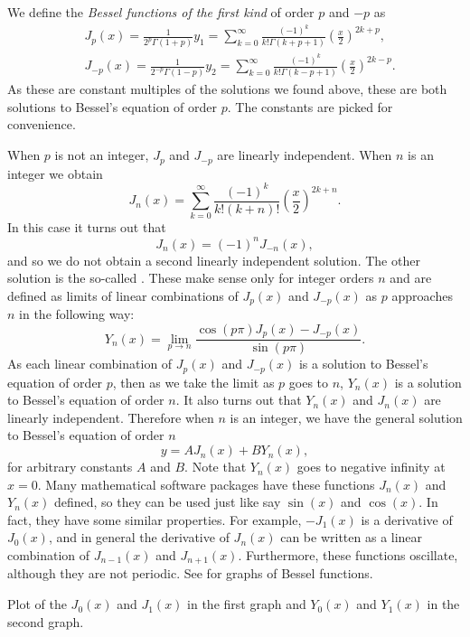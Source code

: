 We define the \emph{Bessel functions of the first kind}%
 of
order $p$ and $-p$ as
\begin{align*}
& J_p(x) = \frac{1}{2^p\Gamma(1+p)} y_1
=
\sum_{k=0}^\infty
\frac{{(-1)}^k}{k! \Gamma(k+p+1)}
{\left(\frac{x}{2}\right)}^{2k+p} ,
\\
& J_{-p}(x) = \frac{1}{2^{-p}\Gamma(1-p)} y_2
=
\sum_{k=0}^\infty
\frac{{(-1)}^k}{k! \Gamma(k-p+1)}
{\left(\frac{x}{2}\right)}^{2k-p} .
\end{align*}
As these are constant multiples of the solutions we found above, these are
both solutions to Bessel's equation of order $p$.  The constants are picked
for convenience.

When $p$ is not an integer, $J_p$
and $J_{-p}$ are linearly independent.  When $n$ is an integer we 
obtain
\begin{equation*}
J_n(x) =
\sum_{k=0}^\infty
\frac{{(-1)}^k}{k! (k+n)!}
{\left(\frac{x}{2}\right)}^{2k+n} .
\end{equation*}
In this case it turns out that
\begin{equation*}
J_n(x) = {(-1)}^nJ_{-n}(x) ,
\end{equation*}
and so we do not obtain a second linearly independent
solution.  The other solution is the
so-called \emph{}.  These make
sense only for integer orders $n$ and
are defined as limits of linear combinations of $J_p(x)$ and $J_{-p}(x)$ as
$p$ approaches $n$ in the
following way:
\begin{equation*}
Y_n(x) = \lim_{p\to n} \frac{\cos(p \pi) J_p(x) - J_{-p}(x)}{\sin(p \pi)} .
\end{equation*}
As each linear combination of $J_p(x)$ and $J_{-p}(x)$ is a solution
to Bessel's equation of order $p$, then as we take the limit as $p$
goes to $n$, $Y_n(x)$ is a solution to Bessel's equation of
order $n$.  It also turns out that $Y_n(x)$ and $J_n(x)$ are linearly
independent.  Therefore when $n$ is an integer, we have the
general solution to Bessel's equation of order $n$
\begin{equation*}
y = A J_n(x) + B Y_n(x) ,
\end{equation*}
for arbitrary constants $A$ and $B$.  Note that
$Y_n(x)$ goes to negative infinity at $x=0$.   Many mathematical software
packages have
these functions $J_n(x)$ and $Y_n(x)$ defined, so they can be used
just like say $\sin(x)$ and $\cos(x)$.  In fact, they have some similar 
properties.  For example, $-J_1(x)$ is a derivative of $J_0(x)$, and
in general the derivative of $J_n(x)$ can be written as a linear
combination of $J_{n-1}(x)$ and $J_{n+1}(x)$.  Furthermore, these
functions oscillate, although they are not periodic.  See
 for graphs of Bessel functions.
\begin{myfig}
\capstart
\caption{Plot of the $J_0(x)$ and $J_1(x)$ in the first graph
and $Y_0(x)$ and $Y_1(x)$ in the second graph.\label{bessel:graphsfig}}
\end{myfig}

